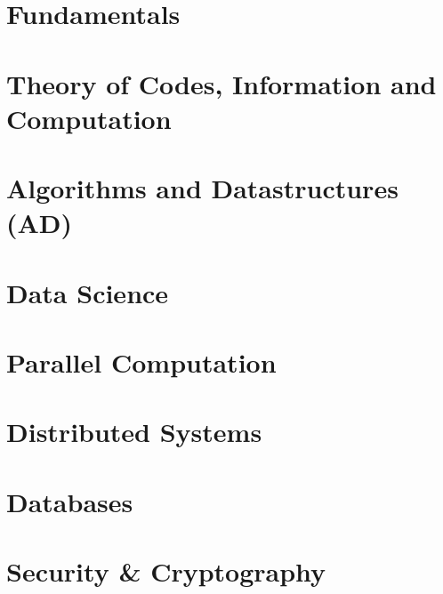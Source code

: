 \documentclass[12pt,twoside]{book}
\begin{document}

\restoregeometry




\part{Fundamentals}



\part{Theory of Codes, Information and Computation}

%
%

\part{Algorithms and Datastructures (AD)}


\part{Data Science}


\part{Parallel Computation}
\part{Distributed Systems}
\part{Databases}
\part{Security \& Cryptography}
\end{document}
